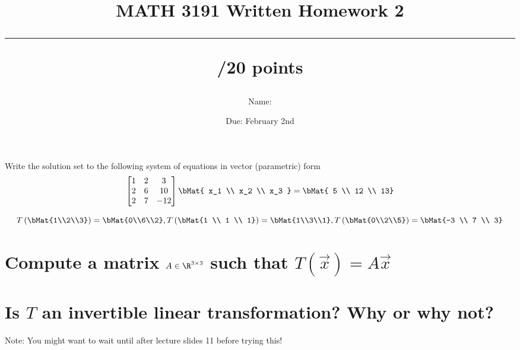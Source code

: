 \documentclass{exam}
\title{MATH 3191 Written Homework 2\\\rule{30pt}{1pt}/20 points}
\author{Name: \rule{150pt}{1pt}}
\date{Due: February 2nd}
\begin{document}
\maketitle
\begin{questions}
\question[5]
    Write the solution set to the following system of equations in vector (parametric) form
    \[
        \begin{bmatrix}
            1 & 2 &  3 \\
            2 & 6 & 10 \\
            2 & 7 &-12 \\
        \end{bmatrix} \bMat{ x_1 \\ x_2 \\ x_3 } = \bMat{ 5 \\ 12 \\ 13}
    \]
    \newpage

    \[
        T\left(\bMat{1\\2\\3}\right) = \bMat{0\\6\\2}, T\left(\bMat{1 \\ 1 \\ 1}\right) = \bMat{1\\3\\1}, T\left(\bMat{0\\2\\5}\right) = \bMat{-3 \\ 7 \\ 3}
    \]

    \begin{parts}
        \part[10]{Compute a matrix $A\in\R^{3\times 3}$ such that $T\left(\vec{x}\right) = A\vec{x}$}
        \vfill

        \part[5]{Is $T$ an invertible linear transformation? Why or why not?}

        Note: You might want to wait until after lecture slides 11 before trying this!
        \vfill
    \end{parts}

\end{questions}
\end{document}
